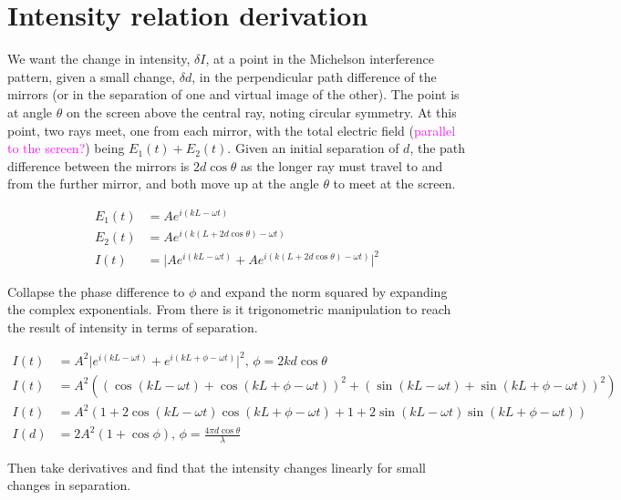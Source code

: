 \documentclass[prb,preprint]{revtex4-1}
\newcommand{\jam}{\textcolor{magenta}}
\begin{document}
\section{Intensity relation derivation}
\label{app:intensity_derivation}

We want the change in intensity, $\delta I$, at a point in the Michelson interference pattern, given a small change, $\delta d$, in the perpendicular path difference of the mirrors (or in the separation of one and virtual image of the other). The point is at angle $\theta$ on the screen above the central ray, noting circular symmetry. At this point, two rays meet, one from each mirror, with the total electric field (\jam{parallel to the screen?}) being $E_1(t) + E_2(t)$. Given an initial separation of $d$, the path difference between the mirrors is $2 d \cos{\theta}$ as the longer ray must travel to and from the further mirror, and both move up at the angle $\theta$ to meet at the screen.

\begin{align}
\label{eq:intensity_derivation}
    E_1(t) &= A e^{i (k L - \omega t)} \\
    E_2(t) &= A e^{i (k (L + 2 d \cos{\theta}) - \omega t)} \\
    I(t) &= \lvert A e^{i (k L - \omega t)} + A e^{i (k (L + 2 d \cos{\theta}) - \omega t)} \rvert^2
\end{align}

Collapse the phase difference to $\phi$ and expand the norm squared by expanding the complex exponentials. From there is it trigonometric manipulation to reach the result of intensity in terms of separation.

\begin{align}    
    I(t) &= A^2 \lvert e^{i (k L - \omega t)} + e^{i (k L + \phi - \omega t)} \rvert^2,\, \phi = 2 k d \cos{\theta} \\
    I(t) &= A^2 ((\cos{(k L - \omega t)} + \cos{(k L + \phi - \omega t)})^2 + (\sin{(k L - \omega t)} + \sin{(k L + \phi - \omega t)})^2) \\
    I(t) &= A^2 (1 + 2 \cos{(k L - \omega t)} \cos{(k L + \phi - \omega t)} + 1 + 2 \sin{(k L - \omega t)} \sin{(k L + \phi - \omega t)}) \\
    I(d) &= 2 A^2 (1 + \cos{\phi}),\, \phi = \frac{4 \pi d \cos{\theta}}{\lambda}
\end{align}

Then take derivatives and find that the intensity changes linearly for small changes in separation.
\end{document}
